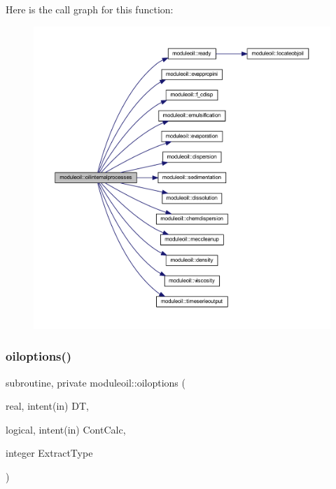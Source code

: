 Here is the call graph for this function\+:\nopagebreak
\begin{figure}[H]
\begin{center}
\leavevmode
\includegraphics[width=350pt]{namespacemoduleoil_a4b104a789e2f264a4494966c5b9a47fd_cgraph}
\end{center}
\end{figure}
\mbox{\label{namespacemoduleoil_aed259a357945d0fe3281c34d220a6dcd}} 
\subsubsection{\texorpdfstring{oiloptions()}{oiloptions()}}
{\footnotesize\ttfamily subroutine, private moduleoil\+::oiloptions (\begin{DoxyParamCaption}\item[{real, intent(in)}]{DT,  }\item[{logical, intent(in)}]{Cont\+Calc,  }\item[{integer}]{Extract\+Type }\end{DoxyParamCaption})\hspace{0.3cm}{\ttfamily [private]}}

